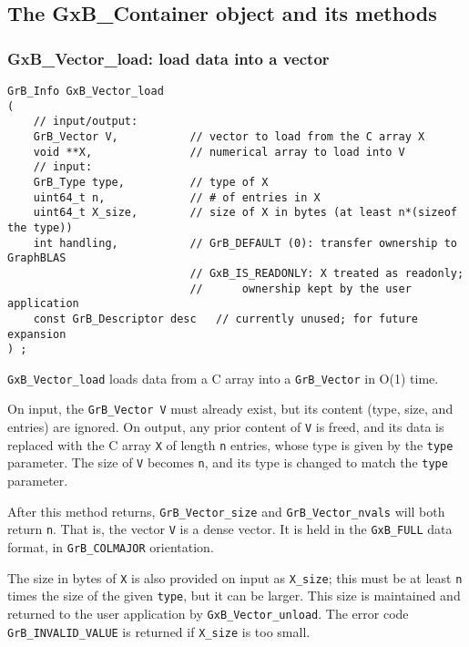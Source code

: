 \newpage
\subsection{The GxB\_Container object and its methods}
\label{container}

\subsubsection{{\sf GxB\_Vector\_load:} load data into a vector}
\label{vector_load}

\begin{mdframed}[userdefinedwidth=6in]
{\footnotesize
\begin{verbatim}
GrB_Info GxB_Vector_load
(
    // input/output:
    GrB_Vector V,           // vector to load from the C array X
    void **X,               // numerical array to load into V
    // input:
    GrB_Type type,          // type of X
    uint64_t n,             // # of entries in X
    uint64_t X_size,        // size of X in bytes (at least n*(sizeof the type))
    int handling,           // GrB_DEFAULT (0): transfer ownership to GraphBLAS
                            // GxB_IS_READONLY: X treated as readonly;
                            //      ownership kept by the user application
    const GrB_Descriptor desc   // currently unused; for future expansion
) ;
\end{verbatim}
} \end{mdframed}

\verb'GxB_Vector_load' loads data from a C array into a \verb'GrB_Vector' in
O(1) time.

On input, the \verb'GrB_Vector V' must already exist, but its content (type,
size, and entries) are ignored.  On output, any prior content of \verb'V' is
freed, and its data is replaced with the C array \verb'X' of length \verb'n'
entries, whose type is given by the \verb'type' parameter.  The size of
\verb'V' becomes \verb'n', and its type is changed to match the \verb'type'
parameter.

After this method returns, \verb'GrB_Vector_size' and \verb'GrB_Vector_nvals' 
will both return \verb'n'.  That is, the vector \verb'V' is a dense vector.
It is held in the \verb'GxB_FULL' data format, in \verb'GrB_COLMAJOR'
orientation.

The size in bytes of \verb'X' is also provided on input as \verb'X_size'; this
must be at least \verb'n' times the size of the given \verb'type', but it can
be larger.  This size is maintained and returned to the user application by
\verb'GxB_Vector_unload'.  The error code \verb'GrB_INVALID_VALUE' is returned
if \verb'X_size' is too small.

